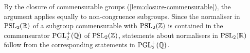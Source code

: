 \begin{remark}
By the closure of commensurable groups (\cref{lem:closure-commensurable}),
the argument applies equally to non-congruence subgroups. Since the
normaliser in $\PSL{2}{\RR}$ of a subgroup commensurable with
$\PSL{2}{\ZZ}$ is contained in the commensurator $\mathrm{PGL}_{2}^{+}(\mathbb{Q})$ of
$\PSL{2}{\ZZ}$, statements about normalisers in $\PSL{2}{\RR}$ follow from
the corresponding statements in $\mathrm{PGL}_{2}^{+}(\mathbb{Q})$.
\end{remark}
